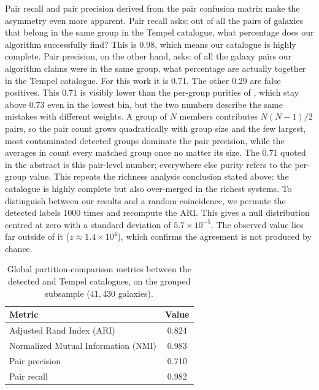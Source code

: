 \documentclass[9pt,a4paper,twocolumn,twoside]{rho-class/rho}
\begin{document}
Pair recall and pair precision derived from the pair confusion matrix make the
asymmetry even more apparent. Pair recall asks: out of all the pairs of galaxies
that belong in the same group in the Tempel catalogue, what percentage does our
algorithm successfully find? This is 0.98, which means our catalogue
is highly complete. Pair precision, on the other hand, asks: of all the galaxy pairs our
algorithm claims were in the same group, what percentage are actually together in the Tempel
catalogue. For this work it is 0.71. The other 0.29 are false positives.
This 0.71 is visibly lower than the per-group purities of ,
which stay above 0.73 even in the lowest bin, but the two numbers describe the same mistakes with
different weights. A group of $N$ members contributes $N(N-1)/2$ pairs, so the
pair count grows quadratically with group size and the few largest, most
contaminated detected groups dominate the pair precision, while the averages in
 count every matched group once no matter its size. The 0.71
quoted in the abstract is this pair-level number; everywhere else purity refers
to the per-group value.
This repeats the richness analysis conclusion stated above: the catalogue is highly
complete but also over-merged in the richest systems. To distinguish between our results and 
a random coincidence, we permute the detected labels 1000 times and recompute the ARI. This
gives a null distribution centred at zero with a standard deviation of $5.7\times10^{-5}$. The
observed value lies far outside of it ($z \approx 1.4\times10^4$), which confirms the agreement
is not produced by chance.

\begin{table}[t]
    \caption{Global partition-comparison metrics between the detected and Tempel
    catalogues, on the grouped subsample ($41{,}430$ galaxies).}
    \label{tab:metrics}
    \centering
    \begin{tabular}{lc}
        \toprule
        Metric & Value \\
        \midrule
        Adjusted Rand Index (ARI)          & 0.824 \\
        Normalized Mutual Information (NMI) & 0.983 \\
        \midrule
        Pair precision                     & 0.710 \\
        Pair recall                        & 0.982 \\
        \bottomrule
    \end{tabular}
\end{table}
\end{document}
